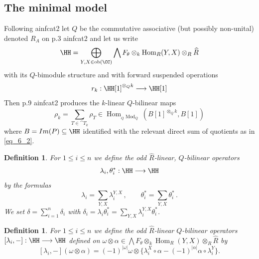 \documentclass[english,letter paper,12pt,leqno]{article}
\theoremstyle{example}
\newtheorem{definition}[theorem]{Definition}
\numberwithin{equation}{section}
\def\Hom{\operatorname{Hom}}
\def\be{\begin{equation}}
\def\ee{\end{equation}}
\begin{document}
\subsection{The minimal model}

Following ainfcat2 let $Q$ be the commutative associative (but possibly non-unital) denoted $R_A$ on p.3 ainfcat2 and let us write
\be
\HH = \bigoplus_{Y,X \in \operatorname{ob}(\CC)} \bigwedge F_\theta \otimes_k \Hom_R(Y,X) \otimes_R \widehat{R}
\ee
with its $Q$-bimodule structure and with forward suspended operations
\[
r_k: \HH[1]^{\otimes_Q k} \lto \HH[1]
\]
Then p.9 ainfcat2 produces the $k$-linear $Q$-bilinear maps
\[
\rho_k = \sum_{T \in \cat{T}_k} \rho_T \in \Hom_{{}_Q \operatorname{Mod}_Q}( B[1]^{\otimes_Q k}, B[1] )
\]
where $B = Im(P) \subseteq \HH$ identified with the relevant direct sum of quotients as in \eqref{eq_6_2}.

\begin{definition} For $1 \le i \le n$ we define the odd $\widehat{R}$-linear, $Q$-bilinear operators
\[
\lambda_i, \theta_i^*: \HH \lto \HH
\]
by the formulas
\[
\lambda_i = \sum_{Y,X} \lambda_i^{Y,X}\,, \qquad \theta_i^* = \sum_{Y,X} \theta_i^*\,.
\]
We set $\delta = \sum_{i=1}^n \delta_i$ with $\delta_i = \lambda_i \theta_i^* = \sum_{Y,X} \lambda^{Y,X}_i \theta_i^*$.
\end{definition}

\begin{definition} For $1 \le i \le n$ we define the odd $\widehat{R}$-linear $Q$-bilinear operators $[\lambda_i, -]: \HH \lto \HH$ defined on $\omega \otimes \alpha \in \bigwedge F_\theta \otimes_k \Hom_R(Y,X) \otimes_R \widehat{R}$ by
\[
[\lambda_i,-](\omega \otimes \alpha) = (-1)^{|\omega|} \omega \otimes \big\{ \lambda_i^X \circ \alpha - (-1)^{|\alpha|} \alpha \circ \lambda_i^Y \big\}.
\]
\end{definition}
\end{document}
